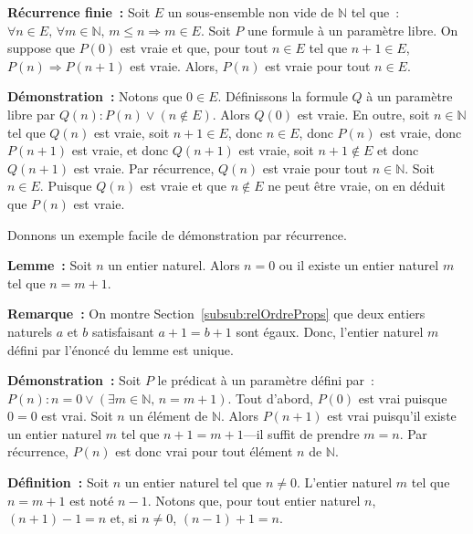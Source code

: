    \done 

\medskip

\noindent\textbf{Récurrence finie :} Soit $E$ un sous-ensemble non vide de $\mathbb{N}$ tel que : $\forall n \in E, \, \forall m \in \mathbb{N}, \, m \leq n \Rightarrow m \in E$. 
    Soit $P$ une formule à un paramètre libre. 
    On suppose que $P(0)$ est vraie et que, pour tout $n \in E$ tel que $n+1 \in E$, $P(n) \Rightarrow P(n+1)$ est vraie. 
    Alors, $P(n)$ est vraie pour tout $n \in E$.

\medskip

\noindent\textbf{Démonstration :} Notons que $0 \in E$. Définissons la formule $Q$ à un paramètre libre par $Q(n): P(n) \vee (n \notin E)$.
    Alors $Q(0)$ est vraie. 
    En outre, soit $n \in \mathbb{N}$ tel que $Q(n)$ est vraie, soit $n+1 \in E$, donc $n \in E$, donc $P(n)$ est vraie, donc $P(n+1)$ est vraie, et donc $Q(n+1)$ est vraie, soit $n+1 \notin E$ et donc $Q(n+1)$ est vraie.
    Par récurrence, $Q(n)$ est vraie pour tout $n \in \mathbb{N}$.
    Soit $n \in E$. 
    Puisque $Q(n)$ est vraie et que $n \notin E$ ne peut être vraie, on en déduit que $P(n)$ est vraie.

   \done 

\medskip

Donnons un exemple facile de démonstration par récurrence. 

\medskip

\noindent\textbf{Lemme :} Soit $n$ un entier naturel. Alors $n=0$ ou il existe un entier naturel $m$ tel que $n=m+1$.

\medskip

\noindent\textbf{Remarque :} On montre Section~\ref{subsub:relOrdreProps} que deux entiers naturels $a$ et $b$ satisfaisant $a+1=b+1$ sont égaux. Donc, l'entier naturel $m$ défini par l'énoncé du lemme est unique. 

\medskip

\noindent\textbf{Démonstration :} Soit $P$ le prédicat à un paramètre défini par : $P(n): n=0 \vee (\exists m \in \mathbb{N}, \, n=m+1)$. 
    Tout d'abord, $P(0)$ est vrai puisque $0=0$ est vrai.
    Soit $n$ un élément de $\mathbb{N}$. 
    Alors $P(n+1)$ est vrai puisqu'il existe un entier naturel $m$ tel que $n+1 = m+1$—il suffit de prendre $m=n$. 
    Par récurrence, $P(n)$ est donc vrai pour tout élément $n$ de $\mathbb{N}$.

   \done 

\medskip

\noindent\textbf{Définition :} Soit $n$ un entier naturel tel que $n \neq 0$. L'entier naturel $m$ tel que $n=m+1$ est noté $n-1$.
    Notons que, pour tout entier naturel $n$, $(n+1)-1 = n$ et, si $n \neq 0$, $(n-1)+1 = n$.

